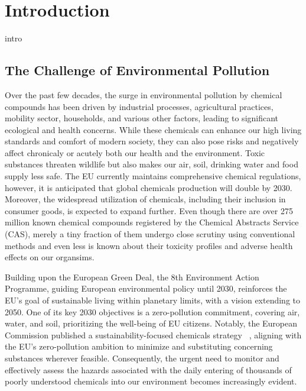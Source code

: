 \newcommand{\package}{\emph}

\chapter{Introduction}\label{chap:introduction}
intro

\section{The Challenge of Environmental Pollution}

Over the past few decades, the surge in environmental pollution by chemical compounds has been driven by industrial processes, agricultural practices, mobility sector, households, and various other factors, leading to significant ecological and health concerns.
While these chemicals can enhance our high living standards and comfort of modern society, they can also pose risks and negatively affect chronicaly or acutely both our health and the environment. Toxic substances threaten wildlife but also makes our air, soil, drinking water and food supply less safe. 
The EU currently maintains comprehensive chemical regulations, however, it is anticipated that global chemicals production will double by 2030. Moreover, the widespread utilization of chemicals, including their inclusion in consumer goods, is expected to expand further.
Even though there are over 275 million known chemical compounds registered by the Chemical Abstracts Service (CAS), merely a tiny fraction of them undergo close scrutiny using conventional methods and even less is known about their toxicity profiles and adverse health effects on our organsims.

Building upon the European Green Deal, the 8th Environment Action Programme, guiding European environmental policy until 2030, reinforces the EU's goal of sustainable living within planetary limits, with a vision extending to 2050. One of its key 2030 objectives is a zero-pollution commitment, covering air, water, and soil, prioritizing the well-being of EU citizens. Notably, the European Commission published a sustainability-focused chemicals strategy ~\cite{arturi}, aligning with the EU's zero-pollution ambition to minimize and substituting concerning substances wherever feasible. 
Consequently, the urgent need to monitor and effectively assess the hazards associated with the daily entering of thousands of poorly understood chemicals into our environment becomes increasingly evident.

